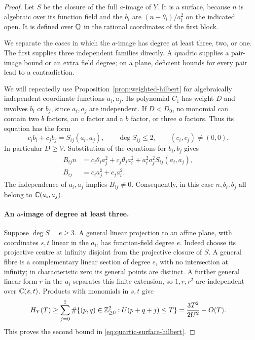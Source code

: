 \begin{proof}
Let $S$ be the closure of the full $a$-image of $Y$.  It is a surface,
because $n$ is algebraic over its function field and the $b_i$ are
$(n-\theta_i)/a_i^2$ on the indicated open.  It is defined over $\mathbb Q$ in
the rational coordinates of the first block.

We separate the cases in which the $a$-image has degree at least three,
two, or one.  The first supplies three independent families directly.
A quadric supplies a pair-image bound or an extra field degree; on a
plane, deficient bounds for every pair lead to a contradiction.

We will repeatedly use Proposition~\ref{prop:weighted-hilbert} for
algebraically independent coordinate functions $a_i,a_j$.
Its polynomial $C_1$ has weight $D$ and
involves $b_i$ or $b_j$, since $a_i,a_j$ are independent.  If $D<D_0$,
no monomial can contain two $b$ factors, an $a$ factor and a $b$ factor,
or three $a$ factors.  Thus its equation has the form
\begin{equation}\label{eq:quartic-small-relation}
 c_i b_i+c_j b_j=S_{ij}(a_i,a_j),\qquad
 \deg S_{ij}\le2,\qquad(c_i,c_j)\ne(0,0).
\end{equation}
In particular $D\ge V$.  Substitution of the equations for $b_i,b_j$
gives
\begin{equation}\label{eq:quartic-rational-n}
 \begin{split}
 B_{ij}n&=c_i\theta_i a_j^2+c_j\theta_j a_i^2
                 +a_i^2a_j^2S_{ij}(a_i,a_j),\\
 B_{ij}&=c_i a_j^2+c_j a_i^2.
 \end{split}
\end{equation}
The independence of $a_i,a_j$ implies $B_{ij}\ne0$.  Consequently, in
this case $n,b_i,b_j$ all belong to $\mathbb C(a_i,a_j)$.

\paragraph{An $a$-image of degree at least three.}
Suppose $\deg S=e\ge3$.  A general linear projection to an affine plane,
with coordinates $s,t$ linear in the $a_i$, has function-field degree
$e$.  Indeed choose its projective centre at infinity disjoint from the
projective closure of $S$.  A general fibre is a complementary linear
section of degree $e$, with no intersection at infinity; in characteristic
zero its general points are distinct.  A further general linear form $r$
in the $a_i$ separates this finite extension, so $1,r,r^2$ are independent
over $\mathbb C(s,t)$.  Products with monomials in $s,t$ give
\[
 H_Y(T)\ge
  \sum_{j=0}^2\#\{(p,q)\in\mathbb Z_{\ge0}^2:U(p+q+j)\le T\}
  =\frac{3T^2}{2U^2}-O(T).
\]
This proves the second bound in \eqref{eq:quartic-surface-hilbert}.


\end{proof}
